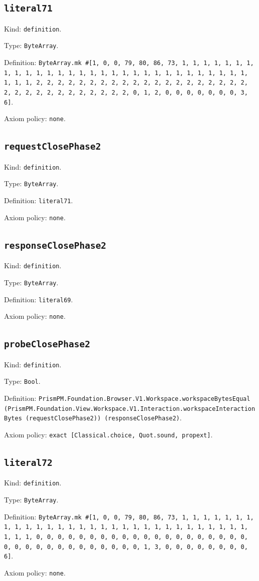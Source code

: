 \documentclass[11pt]{article}
\begin{document}
\subsection*{\texttt{literal71}}
\noindent Kind: \texttt{definition}.\par
\noindent Type: \texttt{ByteArray}.\par
\noindent Definition: \texttt{ByteArray.mk \#[1, 0, 0, 79, 80, 86, 73, 1, 1, 1, 1, 1, 1, 1, 1, 1, 1, 1, 1, 1, 1, 1, 1, 1, 1, 1, 1, 1, 1, 1, 1, 1, 1, 1, 1, 1, 1, 1, 1, 1, 2, 2, 2, 2, 2, 2, 2, 2, 2, 2, 2, 2, 2, 2, 2, 2, 2, 2, 2, 2, 2, 2, 2, 2, 2, 2, 2, 2, 2, 2, 2, 2, 0, 1, 2, 0, 0, 0, 0, 0, 0, 0, 3, 6]}.\par
\noindent Axiom policy: \texttt{none}.\par
\subsection*{\texttt{requestClosePhase2}}
\noindent Kind: \texttt{definition}.\par
\noindent Type: \texttt{ByteArray}.\par
\noindent Definition: \texttt{literal71}.\par
\noindent Axiom policy: \texttt{none}.\par
\subsection*{\texttt{responseClosePhase2}}
\noindent Kind: \texttt{definition}.\par
\noindent Type: \texttt{ByteArray}.\par
\noindent Definition: \texttt{literal69}.\par
\noindent Axiom policy: \texttt{none}.\par
\subsection*{\texttt{probeClosePhase2}}
\noindent Kind: \texttt{definition}.\par
\noindent Type: \texttt{Bool}.\par
\noindent Definition: \texttt{PrismPM.Foundation.Browser.V1.Workspace.workspaceBytesEqual (PrismPM.Foundation.View.Workspace.V1.Interaction.workspaceInteractionBytes (requestClosePhase2)) (responseClosePhase2)}.\par
\noindent Axiom policy: \texttt{exact [Classical.choice, Quot.sound, propext]}.\par
\subsection*{\texttt{literal72}}
\noindent Kind: \texttt{definition}.\par
\noindent Type: \texttt{ByteArray}.\par
\noindent Definition: \texttt{ByteArray.mk \#[1, 0, 0, 79, 80, 86, 73, 1, 1, 1, 1, 1, 1, 1, 1, 1, 1, 1, 1, 1, 1, 1, 1, 1, 1, 1, 1, 1, 1, 1, 1, 1, 1, 1, 1, 1, 1, 1, 1, 1, 0, 0, 0, 0, 0, 0, 0, 0, 0, 0, 0, 0, 0, 0, 0, 0, 0, 0, 0, 0, 0, 0, 0, 0, 0, 0, 0, 0, 0, 0, 0, 0, 0, 1, 3, 0, 0, 0, 0, 0, 0, 0, 0, 6]}.\par
\noindent Axiom policy: \texttt{none}.\par
\end{document}
